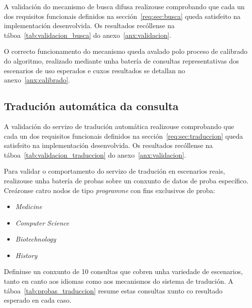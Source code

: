 \documentclass[%
    a4paper,               %
    twoside,               %
    10pt,                  %
]{article}                 %
\begin{document}
A validación do mecanismo de busca difusa realizouse comprobando que cada un dos requisitos funcionais definidos na sección~\ref{req:sec:busca} queda satisfeito na implementación desenvolvida. Os resultados recóllense na táboa~\ref{tab:validacion_busca} do anexo~\ref{anx:validacion}.

O correcto funcionamento do mecanismo queda avalado polo proceso de calibrado do algoritmo, realizado mediante unha batería de consultas representativas dos escenarios de uso esperados e cuxos resultados se detallan no anexo~\ref{anx:calibrado}.

\subsection{Tradución automática da consulta}

A validación do servizo de tradución automática realizouse comprobando que cada un dos requisitos funcionais definidos na sección~\ref{req:sec:traduccion} queda satisfeito na implementación desenvolvida. Os resultados recóllense na táboa~\ref{tab:validacion_traduccion} do anexo~\ref{anx:validacion}.

Para validar o comportamento do servizo de tradución en escenarios reais, realizouse unha batería de probas sobre un conxunto de datos de proba específico. Creáronse catro nodos de tipo \textit{programme} con fins exclusivos de proba:
\begin{itemize}
    \item \textit{Medicine}
    \item \textit{Computer Science}
    \item \textit{Biotechnology}
    \item \textit{History}
\end{itemize}

Definiuse un conxunto de 10 consultas que cobren unha variedade de escenarios, tanto en canto aos idiomas como aos mecanismos do sistema de tradución. A táboa~\ref{tab:probas_traduccion} resume estas consultas xunto co resultado esperado en cada caso.
\end{document}
